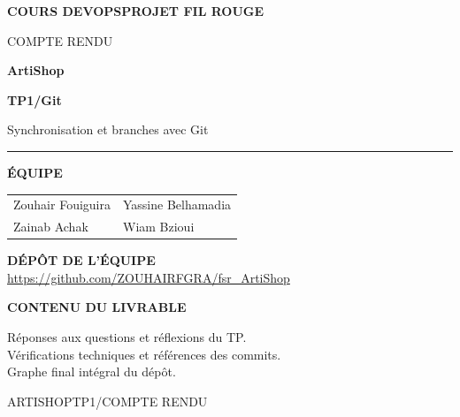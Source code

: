 \documentclass[10pt,a4paper]{article}
\begin{document}
\thispagestyle{empty}
{\sffamily\small\bfseries\color{Teal}COURS DEVOPS\hfill PROJET FIL ROUGE}
\vspace{18mm}

{\sffamily\fontsize{15}{18}\selectfont\color{Muted}COMPTE RENDU}
\vspace{4mm}

{\sffamily\fontsize{40}{44}\selectfont\bfseries\color{Navy}ArtiShop}
\vspace{4mm}

{\sffamily\fontsize{24}{29}\selectfont\bfseries\color{Navy}TP1\enspace\textcolor{Accent}{/}\enspace Git}
\vspace{5mm}

{\sffamily\Large\color{Muted}Synchronisation et branches avec Git}
\vspace{7mm}

{\color{Teal}\rule{34mm}{2pt}}\hspace{2mm}{\color{Border}\rule{127mm}{.5pt}}
\vspace{13mm}

{\sffamily\small\bfseries\color{Teal}ÉQUIPE}
\vspace{4mm}

\renewcommand{\arraystretch}{1.65}
\begin{tabularx}{\linewidth}{@{}X X@{}}
\sffamily\large Zouhair Fouiguira & \sffamily\large Yassine Belhamadia \\
\sffamily\large Zainab Achak & \sffamily\large Wiam Bzioui
\end{tabularx}
\vspace{11mm}

\begin{tcolorbox}[colback=Light,colframe=Border,boxrule=.5pt,arc=0pt,left=5mm,right=5mm,top=4mm,bottom=4mm]
{\sffamily\small\bfseries\color{Teal}DÉPÔT DE L'ÉQUIPE}\\[5pt]
\url{https://github.com/ZOUHAIRFGRA/fsr_ArtiShop}
\end{tcolorbox}
\vfill
{\sffamily\small\bfseries\color{Navy}CONTENU DU LIVRABLE}
\vspace{3mm}

{\color{Muted}Réponses aux questions et réflexions du TP.\\[3pt]
Vérifications techniques et références des commits.\\[3pt]
Graphe final intégral du dépôt.}
\vspace{8mm}

{\sffamily\scriptsize\color{Muted}ARTISHOP\hfill TP1\enspace /\enspace COMPTE RENDU}
\newpage
\end{document}

